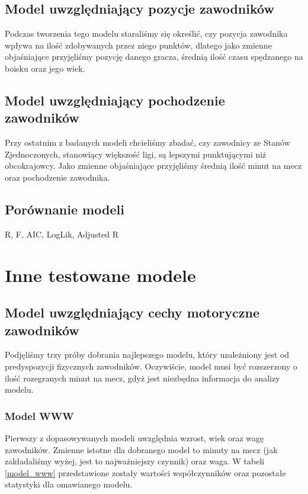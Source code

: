 \documentclass[11pt,a4paper]{article}
\begin{document}
\subsection{Model uwzględniający pozycje zawodników}
Podczas tworzenia tego modelu staraliśmy się określić, czy pozycja zawodnika wpływa na ilość zdobywanych przez niego punktów, dlatego jako zmienne objaśniające przyjęliśmy pozycję danego gracza, średnią ilość czasu spędzanego na boisku oraz jego wiek.

\subsection{Model uwzględniający pochodzenie zawodników}
Przy ostatnim z badanych modeli chcieliśmy zbadać, czy zawodnicy ze Stanów Zjednoczonych, stanowiący większość ligi, są lepszymi punktującymi niż obcokrajowcy.
Jako zmienne objaśniające przyjęliśmy średnią ilość minut na mecz oraz pochodzenie zawodnika.

\subsection{Porównanie modeli}
R, F, AIC, LogLik, Adjusted R

\section{Inne testowane modele}
\subsection{Model uwzględniający cechy motoryczne zawodników}
Podjęliśmy trzy próby dobrania najlepszego modelu, który uzależniony jest od predyspozycji fizycznych zawodników. Oczywiście, model musi być rozszerzony o ilość rozegranych minut na mecz, gdyż jest niezbędna informacja do analizy modelu.

\subsubsection{Model WWW}
Pierwszy z dopasowywanych modeli uwzględnia wzrost, wiek oraz wagę zawodników. Zmienne istotne dla dobranego model to minuty na mecz (jak zakładaliśmy wyżej, jest to najważniejszy czynnik) oraz waga. W tabeli \ref{model_www} przedstawione zostały wartości współczynników oraz pozostałe statystyki dla omawianego modelu. 
\end{document}
